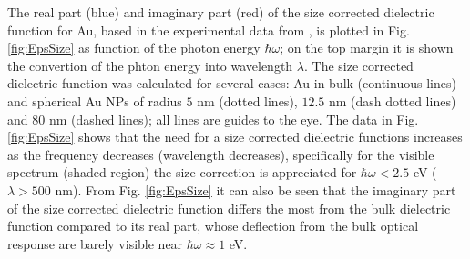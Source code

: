 The real part (blue) and imaginary part (red) of the size corrected dielectric function for Au, based in the experimental data from \citeauthor{johnson_optical_1972},  is plotted in Fig. \ref{fig:EpsSize} as function of the photon energy $\hbar\omega$; on the top margin it is shown the convertion of the phton energy into wavelength $\lambda$. The size corrected dielectric function was calculated for several cases: Au in bulk (continuous lines) and  spherical Au NPs of radius $5$ nm (dotted lines), $12.5$ nm (dash dotted lines) and $80$ nm (dashed lines); all lines are guides to the eye. The data in  Fig. \ref{fig:EpsSize} shows that the need for a size corrected dielectric functions increases as the frequency decreases (wavelength decreases), specifically for the visible spectrum (shaded region) the size correction is appreciated for $\hbar \omega < 2.5$ eV ($\lambda>500$ nm). From Fig. \ref{fig:EpsSize} it can also be seen that the imaginary part of the size corrected dielectric function differs the most from the bulk dielectric function compared to its real part, whose deflection from the bulk optical response are barely visible near $\hbar\omega\approx 1$ eV.
